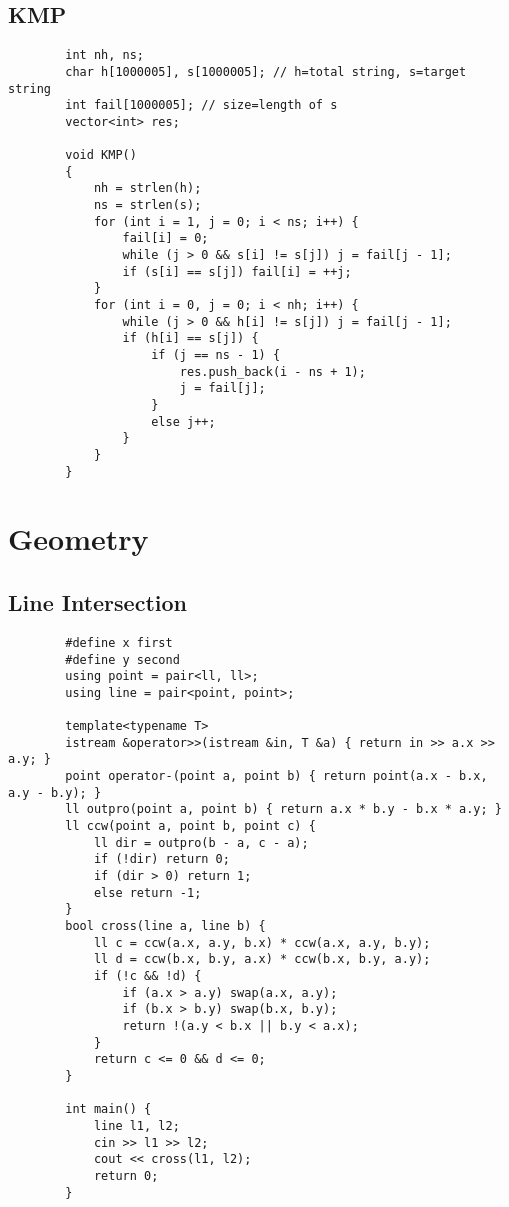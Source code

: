 \documentclass[landscape, 8pt, a4paper, oneside, twocolumn]{extarticle}
\begin{document}
	\subsection{KMP}
	\begin{verbatim}
		int nh, ns;
		char h[1000005], s[1000005]; // h=total string, s=target string
		int fail[1000005]; // size=length of s
		vector<int> res;
		
		void KMP()
		{
			nh = strlen(h);
			ns = strlen(s);
			for (int i = 1, j = 0; i < ns; i++) {
				fail[i] = 0;
				while (j > 0 && s[i] != s[j]) j = fail[j - 1];
				if (s[i] == s[j]) fail[i] = ++j;
			}
			for (int i = 0, j = 0; i < nh; i++) {
				while (j > 0 && h[i] != s[j]) j = fail[j - 1];
				if (h[i] == s[j]) {
					if (j == ns - 1) {
						res.push_back(i - ns + 1);
						j = fail[j];
					}
					else j++;
				}
			}
		}
	\end{verbatim}
	\section{Geometry}
	\subsection{Line Intersection}
	\begin{verbatim}
		#define x first
		#define y second
		using point = pair<ll, ll>;
		using line = pair<point, point>;
		
		template<typename T>
		istream &operator>>(istream &in, T &a) { return in >> a.x >> a.y; }
		point operator-(point a, point b) { return point(a.x - b.x, a.y - b.y); }
		ll outpro(point a, point b) { return a.x * b.y - b.x * a.y; }
		ll ccw(point a, point b, point c) {
			ll dir = outpro(b - a, c - a);
			if (!dir) return 0;
			if (dir > 0) return 1;
			else return -1;
		}
		bool cross(line a, line b) {
			ll c = ccw(a.x, a.y, b.x) * ccw(a.x, a.y, b.y);
			ll d = ccw(b.x, b.y, a.x) * ccw(b.x, b.y, a.y);
			if (!c && !d) {
				if (a.x > a.y) swap(a.x, a.y);
				if (b.x > b.y) swap(b.x, b.y);
				return !(a.y < b.x || b.y < a.x);
			}
			return c <= 0 && d <= 0;
		}
		
		int main() {
			line l1, l2;
			cin >> l1 >> l2;
			cout << cross(l1, l2);
			return 0;
		}
	\end{verbatim}
\end{document}
